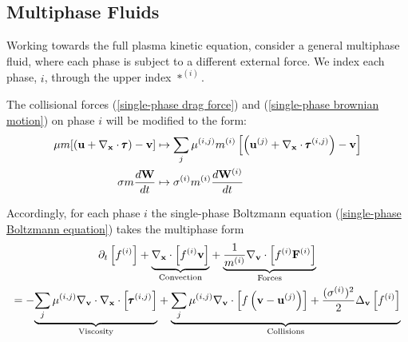 \subsection{Multiphase Fluids}

    Working towards the full plasma kinetic equation, consider a general multiphase fluid, where each phase is subject to a different external force. We index each phase, $i$, through the upper index $*^{(i)}$.

    The collisional forces (\ref{single-phase drag force}) and (\ref{single-phase brownian motion}) on phase $i$ will be modified to the form:  
    \begin{align}
        \mu m[(\mathbf{u} + \nabla_{\mathbf{x}}\cdot\pmb{\mathsf{\tau}}) - \mathbf{v}]  &\mapsto  \sum_{j}\mu^{(i, j)}m^{(i)}\left[\left(\mathbf{u}^{(j)} + \nabla_{\mathbf{x}}\cdot\pmb{\mathsf{\tau}}^{(i, j)}\right) - \mathbf{v}\right]  \\
        \sigma m\frac{d\mathbf{W}}{dt}  &\mapsto  \sigma^{(i)}m^{(i)}\frac{d\mathbf{W}^{(i)}}{dt}
    \end{align}

    Accordingly, for each phase $i$ the single-phase Boltzmann equation (\ref{single-phase Boltzmann equation}) takes the multiphase form
    \begin{multline}\label{multiphase Boltzmann equation}
        \partial_{t}\left[f^{(i)}\right] + \underset{\textrm{Convection}}{\underbrace{\nabla_{\mathbf{x}}\cdot\left[f^{(i)}\mathbf{v}\right]}} + \underset{\textrm{Forces}}{\underbrace{\frac{1}{m^{(i)}}\nabla_{\mathbf{v}}\cdot\left[f^{(i)}\mathbf{F}^{(i)}\right]}}  \\  =  - \underset{\textrm{Viscosity}}{\underbrace{\sum_{j}\mu^{(i, j)}\nabla_{\mathbf{v}}\cdot\nabla_{\mathbf{x}}\cdot\left[\pmb{\mathsf{\tau}}^{(i, j)}\right]}} + \underset{\textrm{Collisions}}{\underbrace{\sum_{j}\mu^{(i, j)}\nabla_{\mathbf{v}}\cdot\left[f\left(\mathbf{v} - \mathbf{u}^{(j)}\right)\right] + \frac{(\sigma^{(i)})^{2}}{2}\Delta_{\mathbf{v}}\left[f^{(i)}\right]}}
    \end{multline}